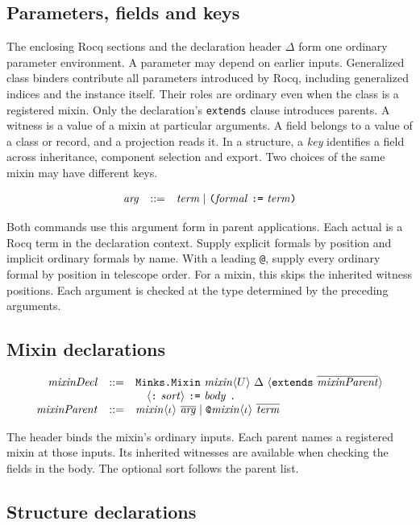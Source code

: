 \documentclass{article}
\newcommand{\ttt}[1]{\texttt{#1}}
\begin{document}
\subsection{Parameters, fields and keys}

The enclosing Rocq sections and the declaration header $\Delta$ form one
ordinary parameter environment. A parameter may depend on earlier inputs.
Generalized class binders contribute all parameters introduced by Rocq,
including generalized indices and the instance itself. Their roles are
ordinary even when the class is a registered mixin.
Only the declaration's \ttt{extends} clause introduces parents.
A witness is a value of a mixin at particular arguments. A field belongs
to a value of a class or record, and a projection reads it. In a
structure, a \emph{key} identifies a field across inheritance, component
selection and export. Two choices of the same mixin may have different keys.

\[
\begin{array}{@{}rcl@{}}
\grammarArg
\end{array}
\]

Both commands use this argument form in parent applications. Each actual
is a Rocq term in the declaration context. Supply explicit formals by position and
implicit ordinary formals by name. With a leading \ttt{@}, supply every
ordinary formal by position in telescope order. For a mixin, this skips
the inherited witness positions. Each argument is checked at the type
determined by the preceding arguments.

\subsection{Mixin declarations}
\label{sec:mixin-app}

\[
\begin{array}{@{}rcl@{}}
\grammarMixinDecl\\
\grammarMixinParent
\end{array}
\]

The header binds the mixin's ordinary inputs. Each parent names a
registered mixin at those inputs. Its inherited witnesses are available
when checking the fields in the body. The optional sort follows the
parent list.

\subsection{Structure declarations}
\label{sec:packing}
\end{document}
